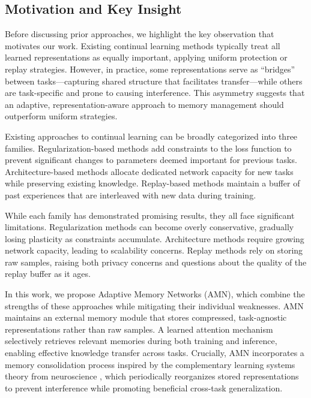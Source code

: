 \documentclass[11pt]{article}
\begin{document}
\subsection{Motivation and Key Insight}

Before discussing prior approaches, we highlight the key observation that motivates our work. Existing continual learning methods typically treat all learned representations as equally important, applying uniform protection or replay strategies. However, in practice, some representations serve as ``bridges'' between tasks---capturing shared structure that facilitates transfer---while others are task-specific and prone to causing interference. This asymmetry suggests that an adaptive, representation-aware approach to memory management should outperform uniform strategies.

Existing approaches to continual learning can be broadly categorized into three families. Regularization-based methods \citep{kirkpatrick2017overcoming, zenke2017continual, aljundi2018memory} add constraints to the loss function to prevent significant changes to parameters deemed important for previous tasks. Architecture-based methods \citep{rusu2016progressive, yoon2018lifelong, li2019learn} allocate dedicated network capacity for new tasks while preserving existing knowledge. Replay-based methods \citep{rebuffi2017icarl, shin2017continual, rolnick2019experience} maintain a buffer of past experiences that are interleaved with new data during training.

While each family has demonstrated promising results, they all face significant limitations. Regularization methods can become overly conservative, gradually losing plasticity as constraints accumulate. Architecture methods require growing network capacity, leading to scalability concerns. Replay methods rely on storing raw samples, raising both privacy concerns and questions about the quality of the replay buffer as it ages.

In this work, we propose Adaptive Memory Networks (AMN), which combine the strengths of these approaches while mitigating their individual weaknesses. AMN maintains an external memory module that stores compressed, task-agnostic representations rather than raw samples. A learned attention mechanism selectively retrieves relevant memories during both training and inference, enabling effective knowledge transfer across tasks. Crucially, AMN incorporates a memory consolidation process inspired by the complementary learning systems theory from neuroscience \citep{mcclelland1995there, kumaran2016learning}, which periodically reorganizes stored representations to prevent interference while promoting beneficial cross-task generalization.
\end{document}
